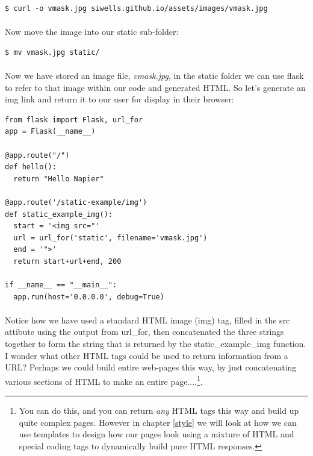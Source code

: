 \documentclass[12pt, a4paper, oneside]{book}
\begin{document}
\begin{lstlisting}[style=DOS]
    $ curl -o vmask.jpg siwells.github.io/assets/images/vmask.jpg 
\end{lstlisting}

\paragraph{} Now move the image into our static sub-folder:

\begin{lstlisting}[style=DOS]
    $ mv vmask.jpg static/
\end{lstlisting}

\paragraph{} Now we have stored an image file, \emph{vmask.jpg}, in the static folder we can use flask to refer to that image within our code and generated HTML. So let's generate an img link and return it to our user for display in their browser:

\begin{lstlisting}
from flask import Flask, url_for
app = Flask(__name__)

@app.route("/")
def hello():
  return "Hello Napier"

@app.route('/static-example/img')
def static_example_img():
  start = '<img src="'
  url = url_for('static', filename='vmask.jpg')
  end = '">'
  return start+url+end, 200

if __name__ == "__main__":
  app.run(host='0.0.0.0', debug=True)
\end{lstlisting}

\paragraph{} Notice how we have used a standard HTML image (img) tag, filled in the src attibute using the output from url\_for, then concatenated the three strings together to form the string that is returned by the static\_example\_img function. I wonder what other HTML tags could be used to return information from a URL? Perhaps we could build entire web-pages this way, by just concatenating various sections of HTML to make an entire page....\footnote{You can do this, and you can return \emph{any} HTML tags this way and build up quite complex pages. However in chapter \ref{style} we will look at how we can use templates to design how our pages look using a mixture of HTML and special coding tags to dynamically build pure HTML responses.}.
\end{document}
